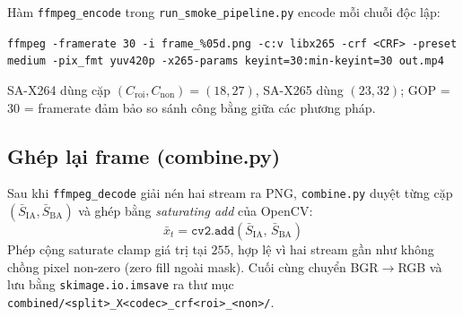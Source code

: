 Hàm \texttt{ffmpeg\_encode} trong \texttt{run\_smoke\_pipeline.py} encode mỗi chuỗi độc lập:
\begin{center}\small
\texttt{ffmpeg -framerate 30 -i frame\_\%05d.png -c:v libx265 -crf <CRF> -preset medium -pix\_fmt yuv420p -x265-params keyint=30:min-keyint=30 out.mp4}
\end{center}
SA-X264 dùng cặp $(C_{\mathrm{roi}}, C_{\mathrm{non}}) = (18, 27)$, SA-X265 dùng $(23, 32)$; GOP = 30 = framerate đảm bảo so sánh công bằng giữa các phương pháp.

\subsection{Ghép lại frame (combine.py)}
\label{sec:ccnet_combine}

Sau khi \texttt{ffmpeg\_decode} giải nén hai stream ra PNG, \texttt{combine.py} duyệt từng cặp $(\bar{S}_{\mathrm{IA}}, \bar{S}_{\mathrm{BA}})$ và ghép bằng \emph{saturating add} của OpenCV:
\begin{equation}
  \bar{x}_t = \texttt{cv2.add}(\bar{S}_{\mathrm{IA}},\, \bar{S}_{\mathrm{BA}})
  \label{eq:ccnet_merge}
\end{equation}
Phép cộng saturate clamp giá trị tại $255$, hợp lệ vì hai stream gần như không chồng pixel non-zero (zero fill ngoài mask). Cuối cùng chuyển BGR$\to$RGB và lưu bằng \texttt{skimage.io.imsave} ra thư mục \texttt{combined/<split>\_X<codec>\_crf<roi>\_<non>/}.
